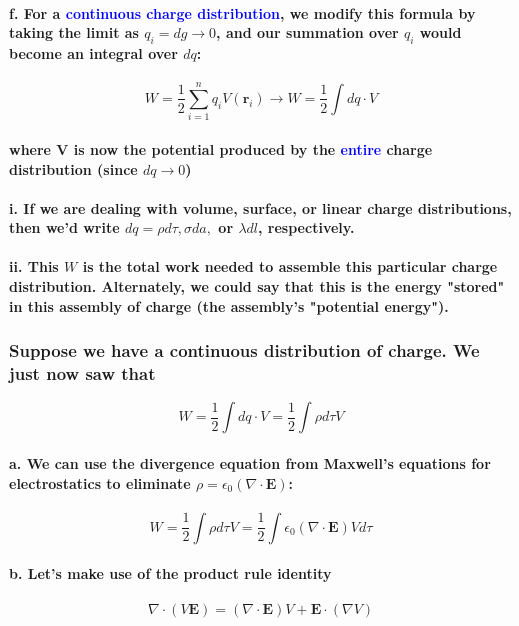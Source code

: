 \documentclass{article}
\begin{document}
\paragraph{\indent f. For a \textcolor{blue}{continuous charge distribution}, we modify this formula by taking the limit as $q_i=dg\rightarrow 0$, and our summation over $q_i$ would become an integral over $dq$:}
\begin{equation*}
    W=\frac{1}{2}\sum_{i=1}^n q_i V(\boldsymbol{r}_i) \longrightarrow W=\frac{1}{2}\int dq\cdot V
\end{equation*}
\paragraph{\indent where V is now the potential produced by the \textcolor{blue}{entire} charge distribution (since $dq\rightarrow0$)}
\paragraph{\indent i. If we are dealing with volume, surface, or linear charge distributions, then we'd write $dq=\rho d\tau, \sigma da,$ or $\lambda dl$, respectively.}
\paragraph{\indent ii. This $W$ is the total work needed to assemble this particular charge distribution. Alternately, we could say that this is the energy "stored" in this assembly of charge (the assembly's "potential energy").}
\subsubsection{Suppose we have a continuous distribution of charge. We just now saw that}
\begin{equation*}
    W=\frac{1}{2}\int dq\cdot V=\frac{1}{2}\int \rho d\tau V
\end{equation*}
\paragraph{\indent a. We can use the divergence equation from Maxwell's equations for electrostatics to eliminate $\rho=\epsilon_0(\nabla \cdot \boldsymbol{E})$:}
\begin{equation*}
    W=\frac{1}{2}\int \rho d\tau V = \frac{1}{2}\int \epsilon_0 (\nabla\cdot \boldsymbol{E}) V d\tau
\end{equation*}
\paragraph{\indent b. Let's make use of the product rule identity}
\begin{equation*}
    \nabla\cdot (V\boldsymbol{E})=(\nabla\cdot \boldsymbol{E})V+\boldsymbol{E}\cdot (\nabla V)
\end{equation*}
\end{document}
